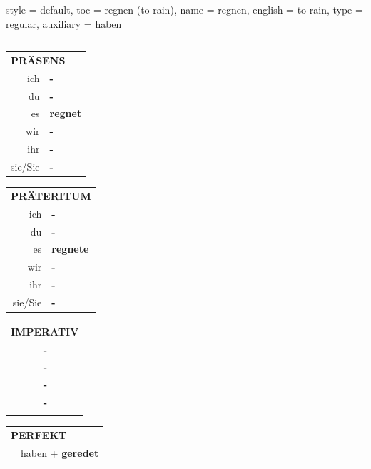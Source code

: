 \begin{verbentry}{
  style = {default},
  toc = {regnen (to rain)},
  name = {regnen},
  english = {to rain},
  type = {regular},
  auxiliary = {haben}
}
 
    
     \vspace{5pt}

    \hrule
    
    \vspace{5pt}

  \begin{tabular}{rl}
     \multicolumn{2}{l}{\textbf{PRÄSENS} }\\
    ich & \textbf{-}\\
    du & \textbf{-}\\
    es & \textbf{regnet}\\
    wir & \textbf{-}\\
    ihr & \textbf{-}\\
    sie/Sie & \textbf{-}\\
  \end{tabular}
  \hfill
     \begin{tabular}{rl}
    \multicolumn{2}{l}{\textbf{PRÄTERITUM} }\\
    ich & \textbf{-}\\
    du & \textbf{-}\\
    es & \textbf{regnete}\\
    wir & \textbf{-}\\
    ihr & \textbf{-}\\
    sie/Sie & \textbf{-}\\
  \end{tabular}
  \hfill
  \begin{tabular}{rl}
     \multicolumn{2}{l}{\textbf{IMPERATIV} }\\
   & \textbf{-}\\
   & \textbf{-}\\
   & \textbf{-}\\
   & \textbf{-}\\
   & \vspace{10pt}
  \end{tabular}

    \vspace{10pt}

 \begin{tabular}{rl}
     \multicolumn{2}{l}{\textbf{PERFEKT}}\\
  &  haben + \textbf{geredet}\\
  \end{tabular}
\hfill
   \begin{tabular}{rl}
   

\end{tabular}
\end{verbentry}
